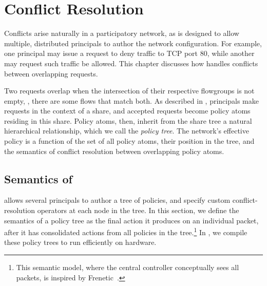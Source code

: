 \chapter{Conflict Resolution}
\label{sec:conflicts}

Conflicts arise naturally in a participatory network, as \sys is
designed to allow multiple, distributed principals to author the network configuration.
For example, one principal may issue a request to deny traffic to
TCP port 80, while another may request  such traffic be allowed.
This chapter discusses how \sys handles conflicts between overlapping requests.

Two requests overlap when the intersection of their
respective flowgroups is not empty, \ie, there are some flows that
match both.  As described in , principals
make requests in the context of a share, and accepted requests
become policy atoms residing in this share. Policy atoms, then,
inherit from the share tree a natural hierarchical relationship,
which we call the \emph{policy tree}. The network's effective policy is a function
of the set of all policy atoms, their position in the tree, and the
semantics of conflict resolution between overlapping policy atoms.

\section{Semantics of \treelang}
\label{sec:Implementation}

\treelang allows several principals to author a tree of policies, and
specify custom conflict-resolution operators at each node in the
tree. In this section, we define the semantics of a policy tree as the
final action it produces on an individual packet, after it has
consolidated actions from all policies in the tree.\footnote{This
  semantic model, where the central controller conceptually sees all
  packets, is inspired by Frenetic~\cite{Foster:2010}.}
In , we compile these policy trees to run efficiently on hardware.


